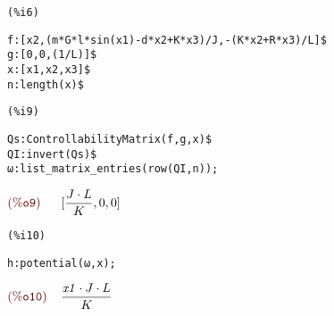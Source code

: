 \noindent
\begin{minipage}[t]{8ex}\color{red}\bf
\begin{verbatim}
(%i6) 
\end{verbatim}
\end{minipage}
\begin{minipage}[t]{\textwidth}\color{blue}
\begin{verbatim}
f:[x2,(m*G*l*sin(x1)-d*x2+K*x3)/J,-(K*x2+R*x3)/L]$
g:[0,0,(1/L)]$
x:[x1,x2,x3]$
n:length(x)$
\end{verbatim}
\end{minipage}

\smallskip

\noindent
\begin{minipage}[t]{8ex}\color{red}\bf
\begin{verbatim}
(%i9) 
\end{verbatim}
\end{minipage}
\begin{minipage}[t]{\textwidth}\color{blue}
\begin{verbatim}
Qs:ControllabilityMatrix(f,g,x)$
QI:invert(Qs)$
ω:list_matrix_entries(row(QI,n));
\end{verbatim}
\end{minipage}

\noindent
$\displaystyle
\parbox{10ex}{$\color{labelcolor}\mathrm{\tt (\%o9) }\quad $}
[\frac{J\cdot L}{K},0,0]\mbox{}
$


\noindent
\begin{minipage}[t]{8ex}\color{red}\bf
\begin{verbatim}
(%i10) 
\end{verbatim}
\end{minipage}
\begin{minipage}[t]{\textwidth}\color{blue}
\begin{verbatim}
h:potential(ω,x);
\end{verbatim}
\end{minipage}

\noindent
$\displaystyle
\parbox{10ex}{$\color{labelcolor}\mathrm{\tt (\%o10) }\quad $}
\frac{\mathit{x1}\cdot J\cdot L}{K}\mbox{}
$
